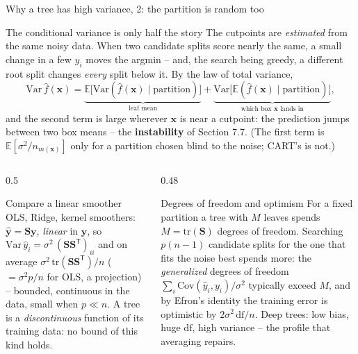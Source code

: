 \documentclass[10pt,aspectratio=169]{beamer}
\begin{document}
\begin{frame}{Why a tree has high variance, 2: the partition is random too}
\footnotesize\setlength{\abovedisplayskip}{3pt}\setlength{\belowdisplayskip}{3pt}
\begin{block}{The conditional variance is only half the story}
The cutpoints are \emph{estimated} from the same noisy data.  When two
candidate splits score nearly the same, a small change in a few $y_i$ moves
the argmin -- and, the search being greedy, a different root split changes
\emph{every} split below it.  By the law of total variance,
\[
  \mathrm{Var}\,\hat f(\bm{x})
  =\underbrace{\mathbb{E}\bigl[\mathrm{Var}(\hat f(\bm{x})\mid\text{partition})\bigr]}_{\text{leaf mean}}
  +\underbrace{\mathrm{Var}\bigl[\mathbb{E}(\hat f(\bm{x})\mid\text{partition})\bigr]}_{\text{which box }\bm{x}\text{ lands in}},
\]
and the second term is large wherever $\bm{x}$ is near a cutpoint: the
prediction jumps between two box means -- the \textbf{instability} of
Section 7.7.  (The first term is $\mathbb{E}[\sigma^2/n_{m(\bm{x})}]$ only
for a partition chosen blind to the noise; CART's is not.)
\end{block}
\begin{columns}[T]
\begin{column}{0.5\textwidth}
\begin{block}{Compare a linear smoother}
OLS, Ridge, kernel smoothers: $\hat{\bm{y}}=\bm{S}\bm{y}$, \emph{linear} in
$\bm{y}$, so $\mathrm{Var}\,\hat y_i=\sigma^2\,(\bm{S}\bm{S}^{\mathsf{T}})_{ii}$
and on average $\sigma^2\,\mathrm{tr}(\bm{S}\bm{S}^{\mathsf{T}})/n$ ($=\sigma^2p/n$
for OLS, a projection) -- bounded, continuous in the data, small when
$p\ll n$.  A tree is a \emph{discontinuous} function of its training data:
no bound of this kind holds.
\end{block}
\end{column}
\begin{column}{0.48\textwidth}
\begin{block}{Degrees of freedom and optimism}
For a fixed partition a tree with $M$ leaves spends $M=\mathrm{tr}(\bm{S})$
degrees of freedom.  Searching $p(n-1)$ candidate splits for the one that
fits the noise best spends more: the \emph{generalized} degrees of freedom
$\sum_i\mathrm{Cov}(\hat y_i,y_i)/\sigma^2$ typically exceed $M$, and by
Efron's identity the training error is optimistic by
$2\sigma^2\,\mathrm{df}/n$.  Deep trees: low bias, huge $\mathrm{df}$, high
variance -- the profile that averaging repairs.
\end{block}
\end{column}
\end{columns}
\end{frame}
\end{document}
